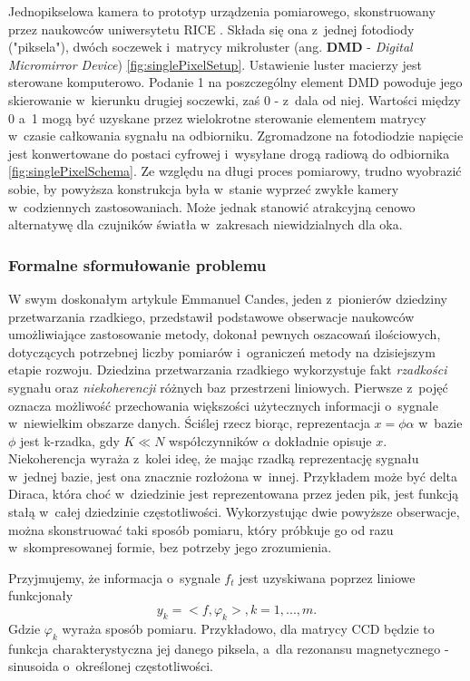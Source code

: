 Jednopikselowa kamera to prototyp urządzenia pomiarowego, skonstruowany przez naukowców uniwersytetu RICE \cite{SinglePixelCamera}. Składa się ona z~jednej fotodiody ("piksela"), dwóch soczewek i~matrycy mikroluster (ang. \textbf{DMD} - \textit{Digital Micromirror Device}) \ref{fig:singlePixelSetup}. Ustawienie luster macierzy jest sterowane komputerowo. Podanie 1 na poszczególny element DMD powoduje jego skierowanie w~kierunku drugiej soczewki, zaś 0 - z~dala od niej. Wartości między 0 a~1 mogą być uzyskane przez wielokrotne sterowanie elementem matrycy w~czasie całkowania sygnału na odbiorniku. Zgromadzone na fotodiodzie napięcie jest konwertowane do postaci cyfrowej i~wysyłane drogą radiową do odbiornika \ref{fig:singlePixelSchema}. Ze względu na długi proces pomiarowy, trudno wyobrazić sobie, by powyższa konstrukcja była w~stanie wyprzeć zwykłe kamery w~codziennych zastosowaniach. Może jednak stanowić atrakcyjną cenowo alternatywę dla czujników światła w~zakresach niewidzialnych dla oka.

\subsubsection{Formalne sformułowanie problemu}
W swym doskonałym artykule \cite{CandesIntro} Emmanuel Candes, jeden z~pionierów dziedziny przetwarzania rzadkiego, przedstawił podstawowe obserwacje naukowców umożliwiające zastosowanie metody, dokonał pewnych oszacowań ilościowych, dotyczących potrzebnej liczby pomiarów i~ograniczeń metody na dzisiejszym etapie rozwoju.
Dziedzina przetwarzania rzadkiego wykorzystuje fakt \textit{rzadkości} sygnału oraz \textit{niekoherencji} \cite{Candes2006} różnych baz przestrzeni liniowych. Pierwsze z~pojęć oznacza możliwość przechowania większości użytecznych informacji o~sygnale w~niewielkim obszarze danych. Ściślej rzecz biorąc, reprezentacja $x = \phi \alpha$ w~bazie $\phi$ jest k-rzadka, gdy $K \ll N$ współczynników $\alpha$ dokładnie opisuje $x$. Niekoherencja wyraża z~kolei ideę, że mając rzadką reprezentację sygnału w~jednej bazie, jest ona znacznie rozłożona w~innej. Przykładem może być delta Diraca, która choć w~dziedzinie jest reprezentowana przez jeden pik, jest funkcją stałą w~całej dziedzinie częstotliwości. Wykorzystując dwie powyższe obserwacje, można skonstruować taki sposób pomiaru, który próbkuje go od razu w~skompresowanej formie, bez potrzeby jego zrozumienia. 

Przyjmujemy, że informacja o~sygnale $f_t$ jest uzyskiwana poprzez liniowe funkcjonały
\begin{equation}
	y_k = <f, \varphi_k>, k = 1,...,m.
\end{equation}
Gdzie $\varphi_k$ wyraża sposób pomiaru. Przykładowo, dla matrycy CCD będzie to funkcja charakterystyczna jej danego piksela, a~dla rezonansu magnetycznego - sinusoida o~określonej częstotliwości.

